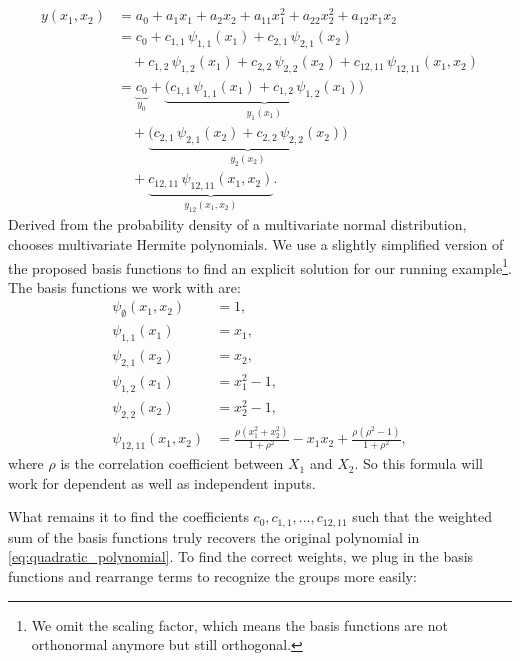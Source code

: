 \begin{align*}
y(x_1,x_2) 
&= a_0 + a_1 x_1 + a_2 x_2 
   + a_{11} x_1^2 + a_{22} x_2^2 + a_{12} x_1 x_2 \\[3pt]
&= c_0 
   + c_{1,1}\,\psi_{1,1}(x_1) 
   + c_{2,1}\,\psi_{2,1}(x_2) \\[-1pt]
&\quad
   + c_{1,2}\,\psi_{1,2}(x_1)
   + c_{2,2}\,\psi_{2,2}(x_2)
   + c_{12,11}\,\psi_{12,11}(x_1,x_2) \\[3pt]
&= 
   \underbrace{c_0}_{y_0}
   + \underbrace{\big(c_{1,1}\,\psi_{1,1}(x_1) 
                     + c_{1,2}\,\psi_{1,2}(x_1)\big)}_{y_1(x_1)} \\[-1pt]
&\quad
   + \underbrace{\big(c_{2,1}\,\psi_{2,1}(x_2) 
                     + c_{2,2}\,\psi_{2,2}(x_2)\big)}_{y_2(x_2)} \\[-1pt]
&\quad
   + \underbrace{c_{12,11}\,\psi_{12,11}(x_1,x_2)}_{y_{12}(x_1,x_2)}.
\end{align*}
Derived from the probability density of a multivariate normal distribution, \cite{rahman2014} chooses multivariate Hermite polynomials. We use a slightly simplified version of the proposed basis functions to find an explicit solution for our running example\footnote{We omit the scaling factor, which means the basis functions are not orthonormal anymore but still orthogonal.}. The basis functions we work with are:
\[
\begin{aligned}
\psi_{\emptyset}(x_1,x_2) &= 1, \\[3pt]
\psi_{1,1}(x_1) &= x_1, \\[3pt]
\psi_{2,1}(x_2) &= x_2, \\[3pt]
\psi_{1,2}(x_1) &= x_1^2 - 1, \\[3pt]
\psi_{2,2}(x_2) &= x_2^2 - 1, \\[3pt]
\psi_{12,11}(x_1,x_2) &= \frac{\rho (x_1^2 + x_2^2)}{1 + \rho^2} 
                         - x_1 x_2 
                         + \frac{\rho(\rho^2 - 1)}{1 + \rho^2},
\end{aligned}
\]
where $\rho$ is the correlation coefficient between $X_1$ and $X_2$. So this formula will work for dependent as well as independent inputs.\par
What remains it to find the coefficients $c_0, c_{1,1}, \dots, c_{12, 11}$ such that the weighted sum of the basis functions truly recovers the original polynomial in \autoref{eq:quadratic_polynomial}.
To find the correct weights, we plug in the basis functions and rearrange terms to recognize the groups more easily:
